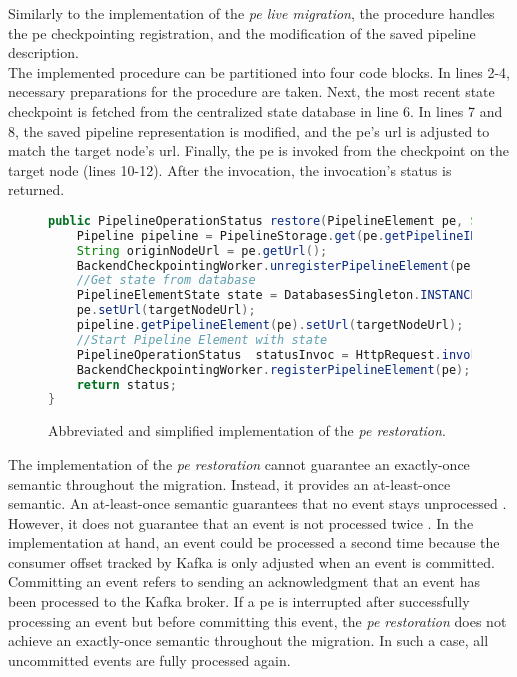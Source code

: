 Similarly to the implementation of the \textit{\acrshort{pe} live migration}, the procedure handles the \gls{pe} checkpointing registration, and the modification of the saved pipeline description.\\
The implemented procedure can be partitioned into four code blocks. In lines 2-4, necessary preparations for the procedure are taken. Next, the most recent state checkpoint is fetched from the centralized state database in line 6. In lines 7 and 8, the saved pipeline representation is modified, and the \gls{pe}'s \gls{url} is adjusted to match the target node's \gls{url}. Finally, the \gls{pe} is invoked from the checkpoint on the target node (lines 10-12). After the invocation, the invocation's status is returned.\\

\begin{figure}[H]
    \begin{lstlisting}[language=Java]
public PipelineOperationStatus restore(PipelineElement pe, String targetNodeUrl){
    Pipeline pipeline = PipelineStorage.get(pe.getPipelineID());
    String originNodeUrl = pe.getUrl();
    BackendCheckpointingWorker.unregisterPipelineElement(pe.ID)
    //Get state from database
    PipelineElementState state = DatabasesSingleton.INSTANCE.getDatabase(pe.ID).getLast();
    pe.setUrl(targetNodeUrl);
    pipeline.getPipelineElement(pe).setUrl(targetNodeUrl);
    //Start Pipeline Element with state
    PipelineOperationStatus  statusInvoc = HttpRequest.invoke(pe, state);
    BackendCheckpointingWorker.registerPipelineElement(pe);
    return status;
}
    \end{lstlisting}
    \caption{Abbreviated and simplified implementation of the \textit{\acrshort{pe} restoration}.}
    \label{fOSRImplementation}
\end{figure}


The implementation of the \textit{\acrshort{pe} restoration} cannot guarantee an exactly-once semantic throughout the migration. Instead, it provides an at-least-once semantic. An at-least-once semantic guarantees that no event stays unprocessed \cite{Huang.2001}. However, it does not guarantee that an event is not processed twice \cite{Huang.2001}. In the implementation at hand, an event could be processed a second time because the consumer offset tracked by Kafka is only adjusted when an event is committed. Committing an event refers to sending an acknowledgment that an event has been processed to the Kafka broker. If a \gls{pe} is interrupted after successfully processing an event but before committing this event, the \textit{\acrshort{pe} restoration} does not achieve an exactly-once semantic throughout the migration. In such a case, all uncommitted events are fully processed again.\par